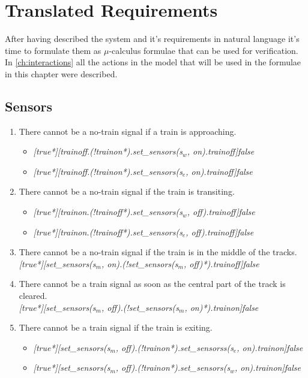 \documentclass[final]{report}
\begin{document}
\chapter{Translated Requirements}
After having described the system and it's requirements in natural language it's time to formulate them as $\mu$-calculus formulae that can be used for verification. In \cref{ch:interactions} all the actions in the model that will be used in the formulae in this chapter were described.

\section{Sensors}
\begin{enumerate}
\item There cannot be a no-train signal if a train is approaching.
\begin{itemize}
\item \textit{[true*][trainoff.(!trainon*).set\_sensors(s$_{w}$, on).trainoff]false}
\item \textit{[true*][trainoff.(!trainon*).set\_sensors(s$_{e}$, on).trainoff]false} 
\end{itemize}

\item There cannot be a no-train signal if the train is transiting.
\begin{itemize}
\item \textit{[true*][trainon.(!trainoff*).set\_sensors(s$_{w}$, off).trainoff]false}
\item \textit{[true*][trainon.(!trainoff*).set\_sensors(s$_{e}$, off).trainoff]false}
\end{itemize}

\item There cannot be a no-train signal if the train is in the middle of the tracks.\\
\textit{[true*][set\_sensors(s$_{m}$, on).(!set\_sensors(s$_{m}$, off)*).trainoff]false}

\item There cannot be a train signal as soon as the central part of the track is cleared.\\
\textit{[true*][set\_sensors(s$_{m}$, off).(!set\_sensors(s$_{m}$, on)*).trainon]false
}

\item There cannot be a train signal if the train is exiting.
\begin{itemize}
\item \textit{[true*][set\_sensors(s$_{m}$, off).(!trainon*).set\_sensorss(s$_{e}$, on).trainon]false}
\item \textit{[true*][set\_sensors(s$_{m}$, off).(!trainon*).set\_sensors(s$_{w}$, on).trainon]false}
\end{itemize}


\end{enumerate}
\end{document}
